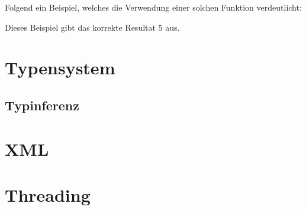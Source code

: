 Folgend ein Beispiel, welches die Verwendung einer solchen Funktion
verdeutlicht: 



Dieses Beispiel gibt das korrekte Resultat 5 aus.


\section{Typensystem}

\subsection{Typinferenz}

\section{XML}

\section{Threading}

